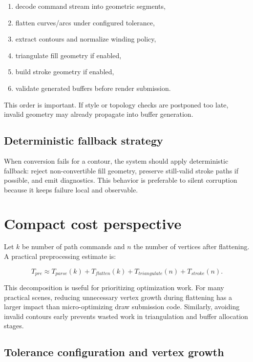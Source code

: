 \begin{enumerate}
\item decode command stream into geometric segments,
\item flatten curves/arcs under configured tolerance,
\item extract contours and normalize winding policy,
\item triangulate fill geometry if enabled,
\item build stroke geometry if enabled,
\item validate generated buffers before render submission.
\end{enumerate}

This order is important.
If style or topology checks are postponed too late, invalid geometry may already propagate into buffer generation.

\subsection{Deterministic fallback strategy}

When conversion fails for a contour, the system should apply deterministic fallback:
reject non-convertible fill geometry, preserve still-valid stroke paths if possible, and emit diagnostics.
This behavior is preferable to silent corruption because it keeps failure local and observable.

\section{Compact cost perspective}

Let $k$ be number of path commands and $n$ the number of vertices after flattening.
A practical preprocessing estimate is:

\begin{equation}
T_{pre} \approx T_{parse}(k) + T_{flatten}(k) + T_{triangulate}(n) + T_{stroke}(n).
\label{eq:compact_cost_model}
\end{equation}

This decomposition is useful for prioritizing optimization work.
For many practical scenes, reducing unnecessary vertex growth during flattening has a larger impact than micro-optimizing draw submission code.
Similarly, avoiding invalid contours early prevents wasted work in triangulation and buffer allocation stages.

\subsection{Tolerance configuration and vertex growth}

